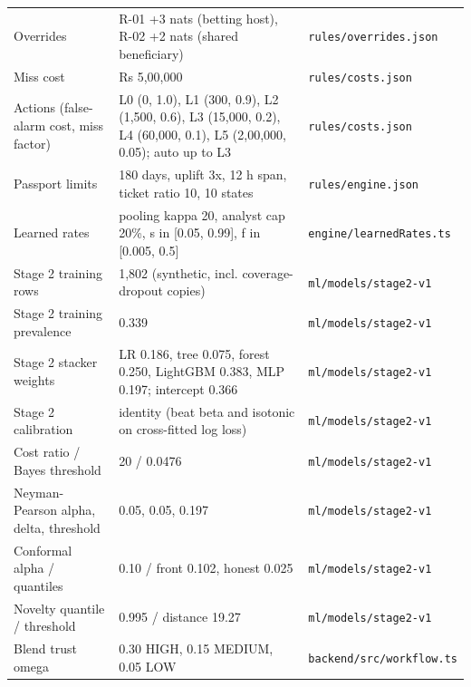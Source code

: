 \documentclass[11pt,a4paper]{article}
\begin{document}
{\begin{longtable}{@{}p{52mm}p{78mm}p{36mm}@{}}
Overrides & R-01 +3 nats (betting host), R-02 +2 nats (shared beneficiary) & \texttt{rules/overrides.json}\\
Miss cost & Rs 5,00,000 & \texttt{rules/costs.json}\\
Actions (false-alarm cost, miss factor) & L0 (0, 1.0), L1 (300, 0.9), L2 (1,500, 0.6), L3 (15,000, 0.2), L4 (60,000, 0.1), L5 (2,00,000, 0.05); auto up to L3 & \texttt{rules/costs.json}\\
Passport limits & 180 days, uplift 3x, 12 h span, ticket ratio 10, 10 states & \texttt{rules/engine.json}\\
Learned rates & pooling kappa 20, analyst cap 20\%, s in [0.05, 0.99], f in [0.005, 0.5] & \texttt{engine/learnedRates.ts}\\
Stage 2 training rows & 1,802 (synthetic, incl. coverage-dropout copies) & \texttt{ml/models/stage2-v1}\\
Stage 2 training prevalence & 0.339 & \texttt{ml/models/stage2-v1}\\
Stage 2 stacker weights & LR 0.186, tree 0.075, forest 0.250, LightGBM 0.383, MLP 0.197; intercept 0.366 & \texttt{ml/models/stage2-v1}\\
Stage 2 calibration & identity (beat beta and isotonic on cross-fitted log loss) & \texttt{ml/models/stage2-v1}\\
Cost ratio / Bayes threshold & 20 / 0.0476 & \texttt{ml/models/stage2-v1}\\
Neyman-Pearson alpha, delta, threshold & 0.05, 0.05, 0.197 & \texttt{ml/models/stage2-v1}\\
Conformal alpha / quantiles & 0.10 / front 0.102, honest 0.025 & \texttt{ml/models/stage2-v1}\\
Novelty quantile / threshold & 0.995 / distance 19.27 & \texttt{ml/models/stage2-v1}\\
Blend trust omega & 0.30 HIGH, 0.15 MEDIUM, 0.05 LOW & \texttt{backend/src/workflow.ts}\\
\bottomrule\end{longtable}}
\end{document}
